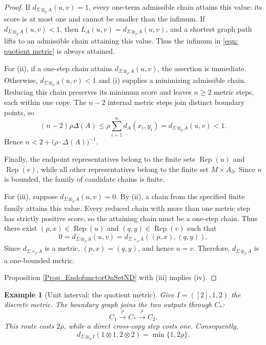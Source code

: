 \documentclass{sn-jnl}%
\theoremstyle{thmstyleone}%
\theoremstyle{thmstyletwo}%
\newtheorem{example}{Example}%
\theoremstyle{thmstylethree}%
\newcommand{\M}{\Sigma}
\newcommand{\Fw}{\M\otimes_{\w}}
\newcommand{\dm}[1]{d_{\M \times_{\w} #1}}
\newcommand{\dqm}[1]{d_{\M \otimes_{\w} #1}}
\newcommand{\w}{\rho}
\begin{document}
\begin{proof}
If $\dqm{A}(u,v)=1$, every one-term admissible chain attains this value: its score is at most one and cannot be smaller than the infimum. If $\dqm{A}(u,v)<1$, then $L_A(u,v)=\dqm{A}(u,v)$, and a shortest graph path lifts to an admissible chain attaining this value. Thus the infimum in \eqref{eqn: quotient metric} is always attained.

For (ii), if a one-step chain attains $\dqm{A}(u,v)$, the assertion is immediate. Otherwise, $\dqm{A}(u,v)<1$ and (i) supplies a minimizing admissible chain. Reducing this chain preserves its minimum score and leaves $n\geq2$ metric steps, each within one copy. The $n-2$ internal metric steps join distinct boundary points, so
\begin{equation} 
\nonumber
    (n-2)\rho\Delta(A) \leq \rho\sum_{i=1}^{n}d_A(x_i,y_i) = \dqm{A}(u,v)<1.
\end{equation}
Hence $n<2+{(\rho\cdot \Delta(A)})^{-1}$.

Finally, the endpoint representatives belong to the finite sets $\operatorname{Rep}(u)$ and $\operatorname{Rep}(v)$, while all other representatives belong to the finite set $M\times A_\partial$. Since $n$ is bounded, the family of candidate chains is finite.

For (iii), suppose $\dqm{A}(u,v)=0$. By (ii), a chain from the specified finite family attains this value. Every reduced chain with more than one metric step has strictly positive score, so the attaining chain must be a one-step chain. Thus there exist $(p,x)\in\operatorname{Rep}(u)$ and $(q,y)\in\operatorname{Rep}(v)$ such that
\begin{equation} 
\nonumber
    0=\dqm{A}(u,v)=\dm{A}((p,x),(q,y)).
\end{equation}
Since $\dm{A}$ is a metric, $(p,x)=(q,y)$, and hence $u=v$. Therefore, $\dqm{A}$ is a one-bounded metric.

Proposition \ref{Prop_EndofunctorOnSetND} with (iii) implies (iv).
\end{proof}

\begin{example}[Unit interval: the quotient metric]
\label{Ex_IntervalQuotientMetric}
    Give $I=([2],1,2)$ the discrete metric. The boundary graph joins the two outputs through $C_*$:
\begin{equation} 
\nonumber
    C_1\xrightarrow{\rho}C_*\xrightarrow{\rho}C_2.
\end{equation}
This route costs $2\rho$, while a direct cross-copy step costs one. Consequently,
\begin{equation} 
\nonumber
    d_{\Fw I}(1\otimes1,2\otimes2)=\min\{1,2\rho\}.
\end{equation}
\end{example}
\end{document}
